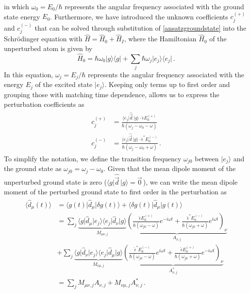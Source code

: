 \documentclass[../Thesis-IJspeert.tex]{subfiles}
\begin{document}
in which $\omega_0=E_0/\hbar$ represents the angular frequency associated with the ground state energy $E_0$. Furthermore, we have introduced the unknown coefficients $c_j^{(+)}$ and $c_j^{(-)}$ that can be solved through substitution of \autoref{ansatzgroundstate} into the Schrödinger equation with $\hat{H}=\hat{H}_0+\hat{H}_I$, where the Hamiltonian $\hat{H}_0$ of the unperturbed atom is given by
\begin{equation}
	\hat{H}_0=\hbar\omega_0\vert g \rangle \langle g \vert + \sum_j \hbar \omega_j \vert e_j \rangle \langle e_j \vert \,.
\end{equation}
In this equation, $\omega_j=E_j/\hbar$ represents the angular frequency associated with the energy $E_j$ of the excited state $\vert e_j \rangle$. Keeping only terms up to first order and grouping those with matching time dependence, allows us to express the perturbation coefficients as
\begin{align}
\begin{split}
c_j^{(+)} &= \frac{\langle e_j \vert \hat{\vec{d}}\, \vert g \rangle \cdot \hat{\epsilon} E_0^{(+)}}{\hbar(\omega_{j}-\omega_0-\omega)} \\ 
c_j^{(-)} &= \frac{\langle e_j \vert \hat{\vec{d}}\, \vert g \rangle \cdot \hat{\epsilon}^* E_0^{(-)}}{\hbar(\omega_{j}-\omega_0+\omega)} \,.
\end{split}
\end{align}
To simplify the notation, we define the transition frequency $\omega_{j0}$ between $\vert e_j \rangle$ and the ground state as $\omega_{j0}=\omega_j-\omega_0$. Given that the mean dipole moment of the unperturbed ground state is zero ($\langle g \vert \hat{\vec{d}} \, \vert g \rangle= \vec{0}\,$), we can write the mean dipole moment of the perturbed ground state to first order in the perturbation as
\begin{align}
\label{equationdipolemomentexpectationvalue}
\begin{split}
	\langle \hat{d}_\mu (t) \rangle &= \langle g(t) \vert \hat{d}_\mu \vert \delta g(t) \rangle + \langle \delta g(t) \vert \hat{d}_\mu \vert g(t) \rangle \\ &= \sum_j \underbrace{ \langle g \vert \hat{{d}}_\mu \vert e_j \rangle \langle e_j \vert \hat{{d}}_\nu \vert g \rangle }_{M_{\mu\nu,j}} \underbrace{ \left( \frac{\hat{\epsilon} E_0^{(+)}}{\hbar(\omega_{j0} - \omega)}e^{-i\omega t} + \frac{\hat{\epsilon}^* E_0^{(-)}}{\hbar ( \omega_{j0} + \omega)} e^{i\omega t} \right)_{\!\nu} }_{A_{\nu,j}} \\ &+ \sum_j \underbrace{  \langle g \vert \hat{{d}}_\nu \vert e_j \rangle \langle e_j \vert \hat{{d}}_\mu \vert g \rangle }_{M_{\nu\mu,j}} \underbrace{ \left( \frac{\hat{\epsilon}^* E_0^{(-)}}{\hbar(\omega_{j0} - \omega)}e^{i\omega t} + \frac{\hat{\epsilon} E_0^{(+)}}{\hbar ( \omega_{j0} + \omega)} e^{-i\omega t} \right)_{\!\nu} }_{A^*_{\nu,j}} \\ &= \sum_j M_{\mu\nu,j} A_{\nu,j} + M_{\nu\mu,j} A_{\nu,j}^* \,.
\end{split}
\end{align}
\end{document}
